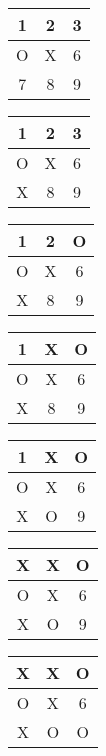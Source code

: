 \documentclass[]{article}
\begin{document}
\begin{enumerate}
        
        \begin{tabular}{ c| c |c }
            1 & 2 & 3 \\
            \hline
            O & X & 6 \\
            \hline
            7 & 8 & 9
        \end{tabular}
        
        \begin{tabular}{ c| c |c }
            1 & 2 & 3 \\
            \hline
            O & X & 6 \\
            \hline
            X & 8 & 9
        \end{tabular}    
        
        \begin{tabular}{ c| c |c }
            1 & 2 & O \\
            \hline
            O & X & 6 \\
            \hline
            X & 8 & 9
        \end{tabular}    
        
        \begin{tabular}{ c| c |c }
            1 & X & O \\
            \hline
            O & X & 6 \\
            \hline
            X & 8 & 9
        \end{tabular} 
        
        \begin{tabular}{ c| c |c }
            1 & X & O \\
            \hline
            O & X & 6 \\
            \hline
            X & O & 9
        \end{tabular}    
        
        \begin{tabular}{ c| c |c }
            X & X & O \\
            \hline
            O & X & 6 \\
            \hline
            X & O & 9
        \end{tabular}
        
        \begin{tabular}{ c| c |c }
            X & X & O \\
            \hline
            O & X & 6 \\
            \hline
            X & O & O
        \end{tabular}
        

\end{enumerate}
\end{document}
